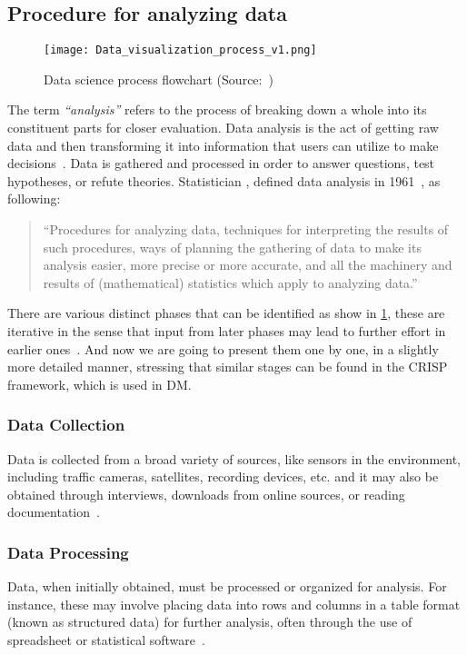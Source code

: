 \subsection{Procedure for analyzing data}\label{subsect:data_analysis_proc}
\begin{figure}[ht]
    \centering
    \texttt{[image: Data\_visualization\_process\_v1.png]}
    \caption{Data science process flowchart (Source:~\cite{Book:doing_data_science})}
    \label{fig:data-science-flowchart}
\end{figure}
The term \textit{``analysis''} refers to the process of breaking down a whole into its constituent parts for closer evaluation.
Data analysis is the act of getting raw data and then transforming it into information that users can utilize to make decisions~\cite{Book:sbrown_2014_transforming}.
Data is gathered and processed in order to answer questions, test hypotheses, or refute theories.
Statistician \citeauthor{Article:future_of_data_tukey}, defined data analysis in 1961~\cite{Article:future_of_data_tukey}, as following:
\begin{quote}
    ``Procedures for analyzing data, techniques for interpreting the results of such procedures, ways of planning the gathering of data to make its analysis easier,
    more precise or more accurate, and all the machinery and results of (mathematical) statistics which apply to analyzing data.''
\end{quote}
There are various distinct phases that can be identified as show in \ref{fig:data-science-flowchart}, these are iterative in the sense that input from later phases may lead to further effort in earlier ones~\cite{Book:doing_data_science}.
And now we are going to present them one by one, in a slightly more detailed manner, stressing that similar stages can be found in the \ac{CRISP} framework, which is used in \acl{DM}.

\subsubsection{Data Collection}
Data is collected from a broad variety of sources, like sensors in the environment, including traffic cameras, satellites, recording devices, etc. and
it may also be obtained through interviews, downloads from online sources, or reading documentation~\cite{Book:doing_data_science}.

\subsubsection{Data Processing}
Data, when initially obtained, must be processed or organized for analysis.
For instance, these may involve placing data into rows and columns in a table format (known as structured data) for further analysis, often through the use of spreadsheet or statistical software~\cite{Book:doing_data_science}.

